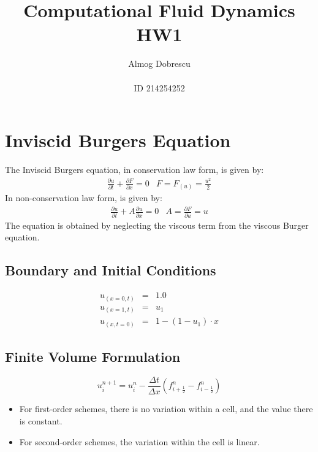 \documentclass[11pt, a4paper]{article}
\title{Computational Fluid Dynamics \\ HW1}
\author{Almog Dobrescu\\\\ID 214254252}
\begin{document}
\maketitle
\thispagestyle{empty}
\newpage

\setcounter{page}{1}
\tableofcontents
\vfil
\listoffigures
\newpage

\section{Inviscid Burgers Equation}
The Inviscid Burgers equation, in conservation law form, is given by:
\begin{equation}
    \begin{array}{cc}
        \displaystyle\frac{\partial u}{\partial t} + \frac{\partial F}{\partial x} = 0 & F = \displaystyle F_{(u)} = \frac{u^2}{2}
    \end{array}
\end{equation} 
In non-conservation law form, is given by:
\begin{equation}
    \begin{array}{cc}
        \displaystyle\frac{\partial u}{\partial t} + A\frac{\partial u}{\partial x} = 0 & A = \displaystyle \frac{\partial F}{\partial u} = u
    \end{array}
\end{equation}
The equation is obtained by neglecting the viscous term from the viscous Burger equation.

\subsection{Boundary and Initial Conditions}
\begin{equation}
    \begin{array}{lcl}
        u_{(x=0,t)} & = & 1.0 \\
        u_{(x=1,t)} & = & u_1 \\
        u_{(x,t=0)} & = & 1-(1-u_1)\cdot x
    \end{array}
\end{equation}

\subsection{Finite Volume Formulation}
\begin{equation}
    u_i^{n+1}=u_i^n-\frac{\Delta t}{\Delta x}\left(f_{i+\frac{1}{2}}^n-f_{i-\frac{1}{2}}^n\right)
\end{equation}
\begin{itemize}
    \item For first-order schemes, there is no variation within a cell, and the value there is constant.
    \item For second-order schemes, the variation within the cell is linear. 
\end{itemize}
\end{document}
